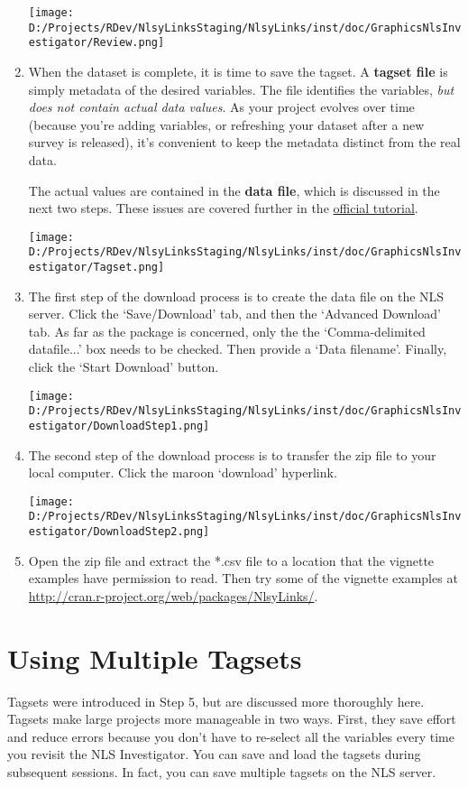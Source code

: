 \documentclass{article}\usepackage[]{graphicx}\usepackage[]{color}
\begin{document}
\begin{enumerate}
\texttt{[image: D:/Projects/RDev/NlsyLinksStaging/NlsyLinks/inst/doc/GraphicsNlsInvestigator/Review.png]}

\item When the dataset is complete, it is time to save the tagset.  A \textbf{tagset file} is simply metadata of the desired variables.  The file identifies the variables, \emph{but does not contain actual data values}.  As your project evolves over time (because you're adding variables, or refreshing your dataset after a new survey is released), it's convenient to keep the metadata distinct from the real data.  

The actual values are contained in the \textbf{data file}, which is discussed in the next two steps.  These issues are covered further in the \href{http://www.nlsinfo.org/InvestigatorGuide/investigator_guide_TOC.html}{official tutorial}.

\texttt{[image: D:/Projects/RDev/NlsyLinksStaging/NlsyLinks/inst/doc/GraphicsNlsInvestigator/Tagset.png]}

\item The first step of the download process is to create the data file on the NLS server.  Click the `Save/Download' tab, and then the `Advanced Download' tab.  As far as the  package is concerned, only the the `Comma-delimited datafile...' box needs to be checked.  Then provide a `Data filename'.  Finally, click the `Start Download' button.

\texttt{[image: D:/Projects/RDev/NlsyLinksStaging/NlsyLinks/inst/doc/GraphicsNlsInvestigator/DownloadStep1.png]}

\item The second step of the download process is to transfer the zip file to your local computer.  Click the maroon `download' hyperlink.

\texttt{[image: D:/Projects/RDev/NlsyLinksStaging/NlsyLinks/inst/doc/GraphicsNlsInvestigator/DownloadStep2.png]}

\item Open the zip file and extract the *.csv file to a location that the vignette examples have permission to read.  Then try some of the  vignette examples at \url{http://cran.r-project.org/web/packages/NlsyLinks/}. 

\end{enumerate}
\section{Using Multiple Tagsets}
Tagsets were introduced in Step 5, but are discussed more thoroughly here.  Tagsets make large projects more manageable in two ways.  First, they save effort and reduce errors because you don't have to re-select all the variables every time you revisit the NLS Investigator.  You can save and load the tagsets during subsequent sessions.  In fact, you can save multiple tagsets on the NLS server.
\end{document}

